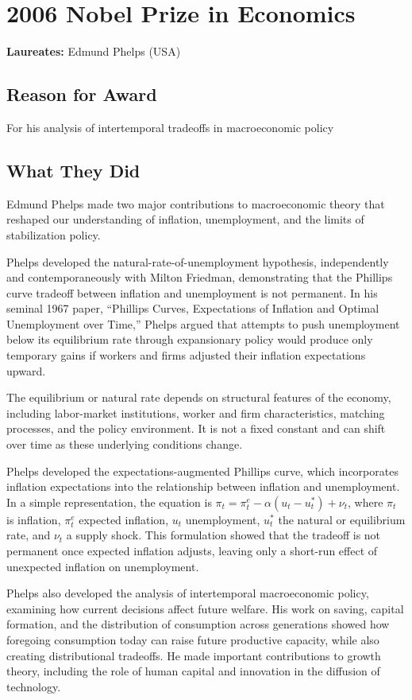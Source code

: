 \chapter{2006 Nobel Prize in Economics}
\textbf{Laureates: }Edmund Phelps (USA)

\section*{Reason for Award}
For his analysis of intertemporal tradeoffs in macroeconomic policy

\section{What They Did}
Edmund Phelps made two major contributions to macroeconomic theory that
reshaped our understanding of inflation, unemployment, and the limits of
stabilization policy.

Phelps developed the natural-rate-of-unemployment hypothesis, independently
and contemporaneously with Milton Friedman, demonstrating that the Phillips
curve tradeoff between inflation and unemployment is not permanent. In his
seminal 1967 paper, ``Phillips Curves, Expectations of Inflation and Optimal
Unemployment over Time,'' Phelps argued that attempts to push unemployment below
its equilibrium rate through expansionary policy would produce only temporary
gains if workers and firms adjusted their inflation expectations upward.

The equilibrium or natural rate depends on structural features of the economy,
including labor-market institutions, worker and firm characteristics, matching
processes, and the policy environment. It is not a fixed constant and can shift
over time as these underlying conditions change.

Phelps developed the expectations-augmented Phillips curve, which incorporates
inflation expectations into the relationship between inflation and unemployment.
In a simple representation, the equation is
$\pi_t = \pi_t^e - \alpha (u_t-u_t^*) + \nu_t$,
where $\pi_t$ is inflation, $\pi_t^e$ expected inflation, $u_t$ unemployment,
$u_t^*$ the natural or equilibrium rate, and $\nu_t$ a supply shock. This
formulation showed that the tradeoff is not permanent once expected inflation
adjusts, leaving only a short-run effect of unexpected inflation on unemployment.

Phelps also developed the analysis of intertemporal macroeconomic policy,
examining how current decisions affect future welfare. His work on saving,
capital formation, and the distribution of consumption across generations showed
how foregoing consumption today can raise future productive capacity, while also
creating distributional tradeoffs. He made important contributions to growth
theory, including the role of human capital and innovation in the diffusion of
technology.

